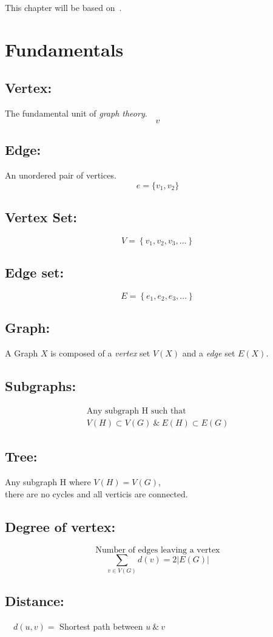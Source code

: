 This chapter will be based on~\citet{GodsilRoyle2001}\cite{GodsilRoyle2001}.
\section{Fundamentals}
\subsection{Vertex:}
The fundamental unit of \emph{graph theory}.
\[v\]
\subsection{Edge:}
An unordered pair of vertices.
\[e=\{v_{1},v_{2}\}\]
\subsection{Vertex Set:}
\[
V=\left\{v_{1}, v_{2}, v_{3}, \ldots\right\}
\]
\subsection{Edge set:}
\[
E=\left\{e_{1}, e_{2}, e_{3}, \ldots\right\}
\]
\subsection{Graph:}
A Graph $X$ is composed of a \emph{vertex} set $V(X)$ and a \emph{edge} set $E(X)$.
\subsection{Subgraphs:}
\[
\begin{array}{cc}
\text{Any subgraph } \mathrm{H} \text{ such that}\\
V(H) \subset V(G) ~\&~ E(H) \subset E(G)
\end{array}
\]
\subsection{Tree:}
\begin{center}
Any subgraph $\mathrm{H}$ where $V(H)=V(G)$,\\ there are no cycles and all verticis are connected.
\end{center}
%
\subsection{Degree of vertex:}
\[\text{Number of edges leaving a vertex}\]
\[\sum_{v \in V(G)} d(v)=2|E(G)| \]
%
%
\subsection{Distance:}
\begin{center}
$\quad d(u, v)=$ Shortest path between $u ~\&~ v$
\end{center}
%
